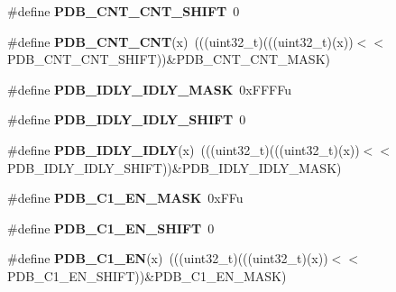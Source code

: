 \begin{DoxyCompactItemize}
\item 
\#define {\bfseries P\+D\+B\+\_\+\+C\+N\+T\+\_\+\+C\+N\+T\+\_\+\+S\+H\+I\+FT}~0\hypertarget{group__PDB__Register__Masks_ga684fc86038c1a05d2ba14aa872e551a6}{}\label{group__PDB__Register__Masks_ga684fc86038c1a05d2ba14aa872e551a6}

\item 
\#define {\bfseries P\+D\+B\+\_\+\+C\+N\+T\+\_\+\+C\+NT}(x)~(((uint32\+\_\+t)(((uint32\+\_\+t)(x))$<$$<$P\+D\+B\+\_\+\+C\+N\+T\+\_\+\+C\+N\+T\+\_\+\+S\+H\+I\+FT))\&P\+D\+B\+\_\+\+C\+N\+T\+\_\+\+C\+N\+T\+\_\+\+M\+A\+SK)\hypertarget{group__PDB__Register__Masks_ga7450994c413fd116da0c44f36fd27f2b}{}\label{group__PDB__Register__Masks_ga7450994c413fd116da0c44f36fd27f2b}

\item 
\#define {\bfseries P\+D\+B\+\_\+\+I\+D\+L\+Y\+\_\+\+I\+D\+L\+Y\+\_\+\+M\+A\+SK}~0x\+F\+F\+F\+Fu\hypertarget{group__PDB__Register__Masks_gaa3a9995da0b93a73827d556de3a7f8ec}{}\label{group__PDB__Register__Masks_gaa3a9995da0b93a73827d556de3a7f8ec}

\item 
\#define {\bfseries P\+D\+B\+\_\+\+I\+D\+L\+Y\+\_\+\+I\+D\+L\+Y\+\_\+\+S\+H\+I\+FT}~0\hypertarget{group__PDB__Register__Masks_ga7ce7e734267097f79a8fd2036dc25271}{}\label{group__PDB__Register__Masks_ga7ce7e734267097f79a8fd2036dc25271}

\item 
\#define {\bfseries P\+D\+B\+\_\+\+I\+D\+L\+Y\+\_\+\+I\+D\+LY}(x)~(((uint32\+\_\+t)(((uint32\+\_\+t)(x))$<$$<$P\+D\+B\+\_\+\+I\+D\+L\+Y\+\_\+\+I\+D\+L\+Y\+\_\+\+S\+H\+I\+FT))\&P\+D\+B\+\_\+\+I\+D\+L\+Y\+\_\+\+I\+D\+L\+Y\+\_\+\+M\+A\+SK)\hypertarget{group__PDB__Register__Masks_ga495ff2eb5cc22dc5cc0585f77eb9c043}{}\label{group__PDB__Register__Masks_ga495ff2eb5cc22dc5cc0585f77eb9c043}

\item 
\#define {\bfseries P\+D\+B\+\_\+\+C1\+\_\+\+E\+N\+\_\+\+M\+A\+SK}~0x\+F\+Fu\hypertarget{group__PDB__Register__Masks_ga318b4eb1bb609120bed14b19c91ef0c1}{}\label{group__PDB__Register__Masks_ga318b4eb1bb609120bed14b19c91ef0c1}

\item 
\#define {\bfseries P\+D\+B\+\_\+\+C1\+\_\+\+E\+N\+\_\+\+S\+H\+I\+FT}~0\hypertarget{group__PDB__Register__Masks_ga99bd07d734f0e46a718933179b61402b}{}\label{group__PDB__Register__Masks_ga99bd07d734f0e46a718933179b61402b}

\item 
\#define {\bfseries P\+D\+B\+\_\+\+C1\+\_\+\+EN}(x)~(((uint32\+\_\+t)(((uint32\+\_\+t)(x))$<$$<$P\+D\+B\+\_\+\+C1\+\_\+\+E\+N\+\_\+\+S\+H\+I\+FT))\&P\+D\+B\+\_\+\+C1\+\_\+\+E\+N\+\_\+\+M\+A\+SK)\hypertarget{group__PDB__Register__Masks_gab2ca4b13b2a865c68c2e1505f4b4f13b}{}\label{group__PDB__Register__Masks_gab2ca4b13b2a865c68c2e1505f4b4f13b}


\end{DoxyCompactItemize}
